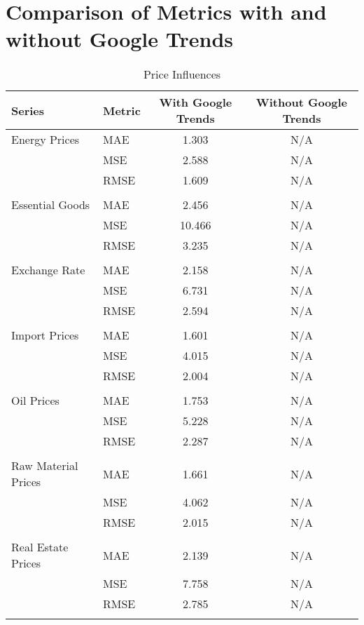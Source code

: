 \documentclass[a4paper,12pt]{article}
\begin{document}
\section*{Comparison of Metrics with and without Google Trends}

\begin{table}
\caption{Price Influences}
\label{tab:metrics_comparison_Price_Influences}
\begin{tabular}{llcc}
\toprule
Series & Metric & With Google Trends & Without Google Trends \\
\midrule
Energy Prices & MAE & 1.303 & N/A \\
 & MSE & 2.588 & N/A \\
 & RMSE & 1.609 & N/A \\
\arrayrulecolor{black!30}\midrule &  &  &  \\
Essential Goods & MAE & 2.456 & N/A \\
 & MSE & 10.466 & N/A \\
 & RMSE & 3.235 & N/A \\
\arrayrulecolor{black!30}\midrule &  &  &  \\
Exchange Rate & MAE & 2.158 & N/A \\
 & MSE & 6.731 & N/A \\
 & RMSE & 2.594 & N/A \\
\arrayrulecolor{black!30}\midrule &  &  &  \\
Import Prices & MAE & 1.601 & N/A \\
 & MSE & 4.015 & N/A \\
 & RMSE & 2.004 & N/A \\
\arrayrulecolor{black!30}\midrule &  &  &  \\
Oil Prices & MAE & 1.753 & N/A \\
 & MSE & 5.228 & N/A \\
 & RMSE & 2.287 & N/A \\
\arrayrulecolor{black!30}\midrule &  &  &  \\
Raw Material Prices & MAE & 1.661 & N/A \\
 & MSE & 4.062 & N/A \\
 & RMSE & 2.015 & N/A \\
\arrayrulecolor{black!30}\midrule &  &  &  \\
Real Estate Prices & MAE & 2.139 & N/A \\
 & MSE & 7.758 & N/A \\
 & RMSE & 2.785 & N/A \\
\arrayrulecolor{black!30}\midrule &  &  &  \\

\end{tabular}
\end{table}
\end{document}
